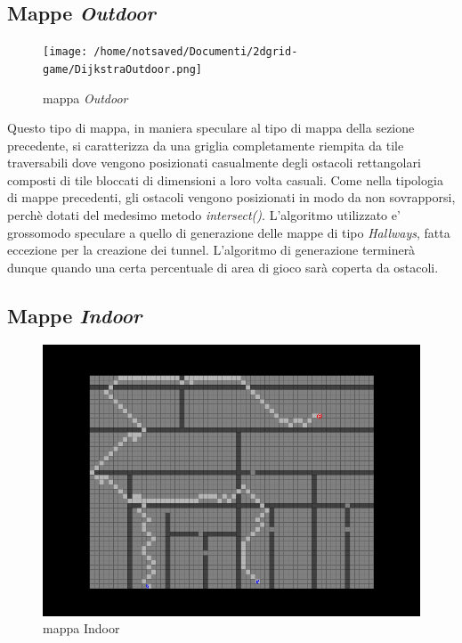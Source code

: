 \documentclass[11pt]{book}
\begin{document}
{\subsection{Mappe \emph{Outdoor}}
\begin{figure}[h]
\centering
\texttt{[image: /home/notsaved/Documenti/2dgrid-game/DijkstraOutdoor.png]}
\caption{mappa \emph{Outdoor}}
\label{img2}
\end{figure}
Questo tipo di mappa, in maniera speculare al tipo di mappa della sezione precedente, si caratterizza da una griglia completamente riempita da tile traversabili dove vengono posizionati casualmente degli ostacoli rettangolari composti di tile bloccati di dimensioni a loro volta casuali.
Come nella tipologia di mappe precedenti, gli ostacoli vengono posizionati in modo da non sovrapporsi, perch\`e dotati del medesimo metodo \emph{intersect()}. L'algoritmo utilizzato e' grossomodo speculare a quello di generazione delle mappe di tipo \emph{Hallways}, fatta eccezione per la creazione dei tunnel. L'algoritmo di generazione terminer\`a dunque quando una certa percentuale di area di gioco sar\`a coperta da ostacoli.
\subsection{Mappe \emph{Indoor}}
\begin{figure}[H]
\centering
\includegraphics[scale=0.30]{../DijkstraIndoor.png}
\caption{mappa Indoor}
\label{img3}
\end{figure}

}
\end{document}
